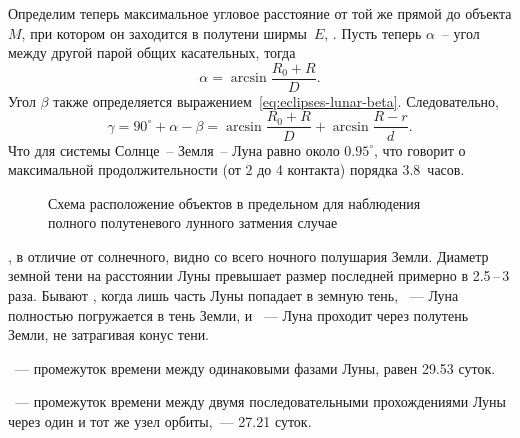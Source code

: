 Определим теперь максимальное угловое расстояние от той же прямой до объекта $M$, при котором он заходится в полутени ширмы~$E$, . Пусть теперь $\alpha$~-- угол между другой парой общих касательных, тогда
\begin{equation*}
    \alpha = \arcsin \frac{R_0 + R}{D}.
\end{equation*}
Угол $\beta$ также определяется выражением~\eqref{eq:eclipses-lunar-beta}. Следовательно,
\begin{equation*}
    \gamma = 90^\circ + \alpha - \beta = \arcsin \frac{R_0 + R}{D} + \arcsin \frac{R - r}{d}.
\end{equation*}
Что для системы Солнце~-- Земля~-- Луна равно около $0.95^\circ$, что говорит о максимальной продолжительности  (от 2 до 4 контакта) порядка $3.8$~часов.

\begin{figure}[h!]
    \centering
    
    \caption{Схема расположение объектов в предельном для наблюдения полного полутеневого лунного затмения случае}
    \label{pic:eclipses-semi-shadow-lunar-eclipse}    
\end{figure}

% 
%
%    
, в отличие от солнечного, видно со всего ночного полушария Земли. Диаметр земной тени на расстоянии Луны превышает размер последней примерно в 2.5\,--\,3 раза. Бывают , когда лишь часть Луны попадает в земную тень, ~--- Луна полностью погружается в тень Земли, и ~--- Луна проходит через полутень Земли, не затрагивая конус тени.

~--- промежуток времени между одинаковыми фазами Луны, равен 29.53 суток.

~--- промежуток времени между двумя последовательными прохождениями Луны через один и тот же узел орбиты,~--- 27.21 суток.

